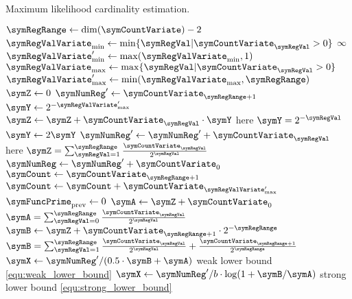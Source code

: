 \documentclass[a4paper]{scrartcl}
\begin{document}
\begin{algorithm}
\caption{Maximum likelihood cardinality estimation.}
\ContinuedFloat
\label{alg:estimate_ml}
\begin{algorithmic}
\State $\symRegRange\gets\dim(\boldsymbol{\symCountVariate})-2$
\State $\symRegValVariate_\text{min} \gets \min\lbrace \symRegVal\vert\symCountVariate_\symRegVal>0\rbrace$
\State\Return $\infty$
\EndIf
\State $\symRegValVariate'_\text{min} \gets \max(\symRegValVariate_\text{min}, 1)$
\State $\symRegValVariate_\text{max} \gets \max\lbrace \symRegVal\vert\symCountVariate_\symRegVal>0\rbrace$
\State $\symRegValVariate'_\text{max} \gets \min(\symRegValVariate_\text{max}, \symRegRange)$
\State $\symZ \gets 0$
\State $\symNumReg'\gets \symCountVariate_{\symRegRange+1}$
\State $\symY \gets 2^{-\symRegValVariate'_\text{max}}$
\State $\symZ \gets \symZ + \symCountVariate_\symRegVal\cdot\symY$
\Comment here $\symY = 2^{-\symRegVal}$
\State $\symY \gets 2\symY$
\State $\symNumReg'\gets\symNumReg' + \symCountVariate_\symRegVal$
\EndFor
\State\Comment here $\symZ=\sum_{\symRegVal=1}^{\symRegRange}\frac{\symCountVariate_\symRegVal}{2^\symRegVal}$
\State $\symNumReg \gets \symNumReg' + \symCountVariate_0$ 
\State $\symCount \gets \symCountVariate_{\symRegRange+1}$
\State $\symCount \gets \symCount + \symCountVariate_{\symRegValVariate'_\text{max}}$
\EndIf
\State $\symFuncPrime_\text{prev}\gets 0$
\State $\symA\gets \symZ + \symCountVariate_0$
\Comment $\symA = \sum_{\symRegVal=0}^{\symRegRange}\frac{\symCountVariate_\symRegVal}{2^\symRegVal}$
\State $\symB\gets \symZ + 
\symCountVariate_{\symRegRange+1}\cdot 2^{-\symRegRange}$
\Comment $\symB = \sum_{\symRegVal=1}^{\symRegRange}\frac{\symCountVariate_\symRegVal}{2^\symRegVal} + \frac{\symCountVariate_{\symRegRange+1}}{2^\symRegRange}$
\If{$\symB \leq 1.5\cdot\symA$}
\State $\symX \gets \symNumReg'/(0.5\cdot \symB+\symA)$ \Comment weak lower bound \eqref{equ:weak_lower_bound}
\Else
\State $\symX \gets \symNumReg'/b \cdot \log(1+\symB/\symA)$ \Comment strong lower bound \eqref{equ:strong_lower_bound}
\EndIf
{}
\end{algorithmic}
\end{algorithm}
\end{document}
